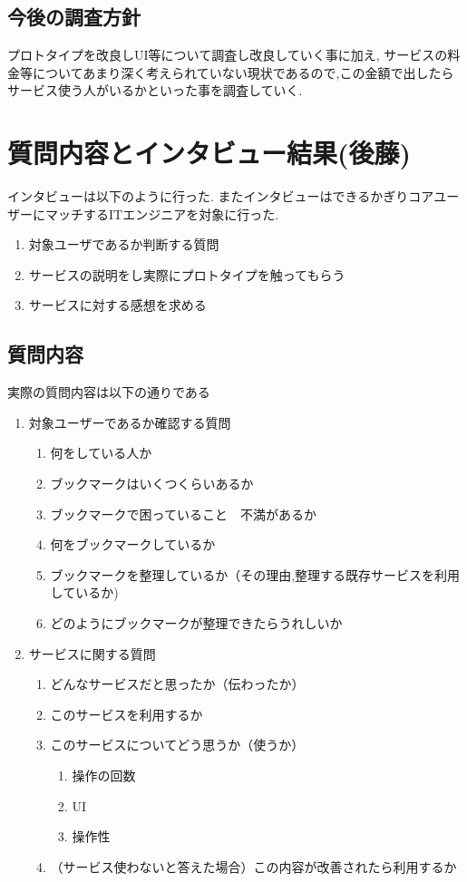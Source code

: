 \documentclass[a4paper,10pt,fleqn]{jsarticle}
\begin{document}
\subsection{今後の調査方針}
プロトタイプを改良しUI等について調査し改良していく事に加え,
サービスの料金等についてあまり深く考えられていない現状であるので,この金額で出したらサービス使う人がいるかといった事を調査していく.

\section{質問内容とインタビュー結果(後藤)}
インタビューは以下のように行った. またインタビューはできるかぎりコアユーザーにマッチするITエンジニアを対象に行った.
\begin{enumerate}
  \item 対象ユーザであるか判断する質問
  \item サービスの説明をし実際にプロトタイプを触ってもらう
  \item サービスに対する感想を求める
\end{enumerate}

\subsection{質問内容}
実際の質問内容は以下の通りである
\begin{enumerate}
  \item 対象ユーザーであるか確認する質問
  \begin{enumerate}
    \item 何をしている人か
    \item ブックマークはいくつくらいあるか
    \item ブックマークで困っていること　不満があるか
    \item 何をブックマークしているか
    \item ブックマークを整理しているか（その理由,整理する既存サービスを利用しているか)
    \item どのようにブックマークが整理できたらうれしいか
  \end{enumerate}
  \item サービスに関する質問
  \begin{enumerate}
    \item どんなサービスだと思ったか（伝わったか）
    \item このサービスを利用するか
    \item このサービスについてどう思うか（使うか）
    \begin{enumerate}
      \item 操作の回数
      \item UI
      \item 操作性
    \end{enumerate}
    \item （サービス使わないと答えた場合）この内容が改善されたら利用するか
  \end{enumerate}
\end{enumerate}
\end{document}
